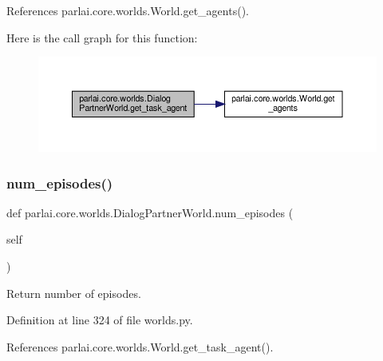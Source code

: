 References parlai.\+core.\+worlds.\+World.\+get\+\_\+agents().

Here is the call graph for this function\+:
\nopagebreak
\begin{figure}[H]
\begin{center}
\leavevmode
\includegraphics[width=350pt]{classparlai_1_1core_1_1worlds_1_1DialogPartnerWorld_ac3a0c82c725967468208ec10022b6abe_cgraph}
\end{center}
\end{figure}
\mbox{\label{classparlai_1_1core_1_1worlds_1_1DialogPartnerWorld_ab34285faaee3830fbf1d9d53869ec47c}} 
\subsubsection{\texorpdfstring{num\+\_\+episodes()}{num\_episodes()}}
{\footnotesize\ttfamily def parlai.\+core.\+worlds.\+Dialog\+Partner\+World.\+num\+\_\+episodes (\begin{DoxyParamCaption}\item[{}]{self }\end{DoxyParamCaption})}

\begin{DoxyVerb}Return number of episodes.\end{DoxyVerb}
 

Definition at line 324 of file worlds.\+py.



References parlai.\+core.\+worlds.\+World.\+get\+\_\+task\+\_\+agent().



